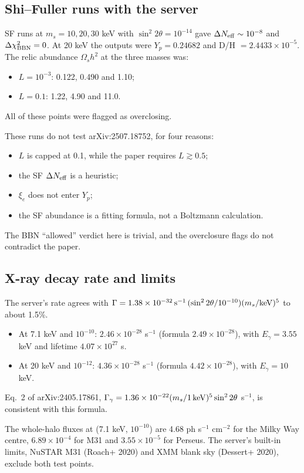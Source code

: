 \documentclass[11pt,a4paper]{article}
\begin{document}
\subsection{Shi--Fuller runs with the server}
SF runs at $m_s=10,20,30$ keV with $\sin^2 2\theta=10^{-14}$ gave $\Delta N_{\rm eff}\sim10^{-8}$ and $\Delta\chi^2_{\rm BBN}=0$. At 20 keV the outputs were $Y_p=0.24682$ and D/H $=2.4433\times10^{-5}$. The relic abundance $\Omega_s h^2$ at the three masses was:
\begin{itemize}
\item $L=10^{-3}$: 0.122, 0.490 and 1.10;
\item $L=0.1$: 1.22, 4.90 and 11.0.
\end{itemize}
All of these points were flagged as overclosing.

These runs do not test arXiv:2507.18752, for four reasons:
\begin{itemize}
\item $L$ is capped at 0.1, while the paper requires $L\gtrsim0.5$;
\item the SF $\Delta N_{\rm eff}$ is a heuristic;
\item $\xi_e$ does not enter $Y_p$;
\item the SF abundance is a fitting formula, not a Boltzmann calculation.
\end{itemize}
The BBN ``allowed'' verdict here is trivial, and the overclosure flags do not contradict the paper.

\subsection{X-ray decay rate and limits}
The server's rate agrees with $\Gamma=1.38\times10^{-32}\,{\rm s^{-1}}\,(\sin^2 2\theta/10^{-10})(m_s/{\rm keV})^5$ to about 1.5\%.
\begin{itemize}
\item At 7.1 keV and $10^{-10}$: $2.46\times10^{-28}$ s$^{-1}$ (formula $2.49\times10^{-28}$), with $E_\gamma=3.55$ keV and lifetime $4.07\times10^{27}$ s.
\item At 20 keV and $10^{-12}$: $4.36\times10^{-28}$ s$^{-1}$ (formula $4.42\times10^{-28}$), with $E_\gamma=10$ keV.
\end{itemize}
Eq.~2 of arXiv:2405.17861, $\Gamma_\gamma=1.36\times10^{-22}(m_s/1\,{\rm keV})^5\sin^2 2\theta$ s$^{-1}$, is consistent with this formula.

The whole-halo fluxes at (7.1 keV, $10^{-10}$) are 4.68 ph s$^{-1}$ cm$^{-2}$ for the Milky Way centre, $6.89\times10^{-4}$ for M31 and $3.55\times10^{-5}$ for Perseus. The server's built-in limits, NuSTAR M31 (Roach+ 2020) and XMM blank sky (Dessert+ 2020), exclude both test points.
\end{document}
